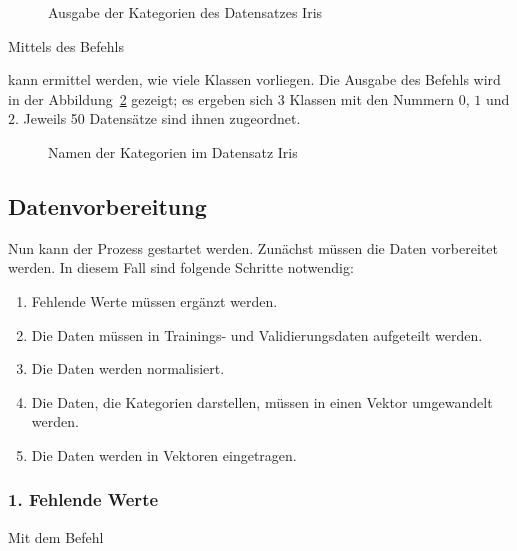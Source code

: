 

\medskip

\begin{figure}[H]
	\caption{Ausgabe der Kategorien des Datensatzes Iris}\label{TensorFlowHeadType}
\end{figure}

Mittels des Befehls 

\medskip


\medskip

kann ermittel werden, wie viele Klassen vorliegen. Die Ausgabe des Befehls wird in der Abbildung~\ref{TensorFlowIrisTypes} gezeigt; es ergeben sich 3 Klassen mit den Nummern $0$, $1$ und $2$. Jeweils 50 Datensätze sind ihnen zugeordnet.

\begin{figure}[H]
	\caption{Namen der Kategorien im Datensatz Iris}\label{TensorFlowIrisTypes}
\end{figure}


\subsection{Datenvorbereitung}

Nun kann der Prozess gestartet werden. Zunächst müssen die Daten vorbereitet werden.
In diesem Fall sind folgende Schritte notwendig: 

\begin{enumerate}
  \item Fehlende Werte müssen ergänzt werden.
  \item Die Daten müssen in Trainings- und Validierungsdaten aufgeteilt werden.
  \item Die Daten werden normalisiert.
  \item Die Daten, die Kategorien darstellen, müssen in einen Vektor umgewandelt werden.
  \item Die Daten werden in Vektoren eingetragen.
\end{enumerate}
	
\subsubsection{1. Fehlende Werte}

Mit dem Befehl 

